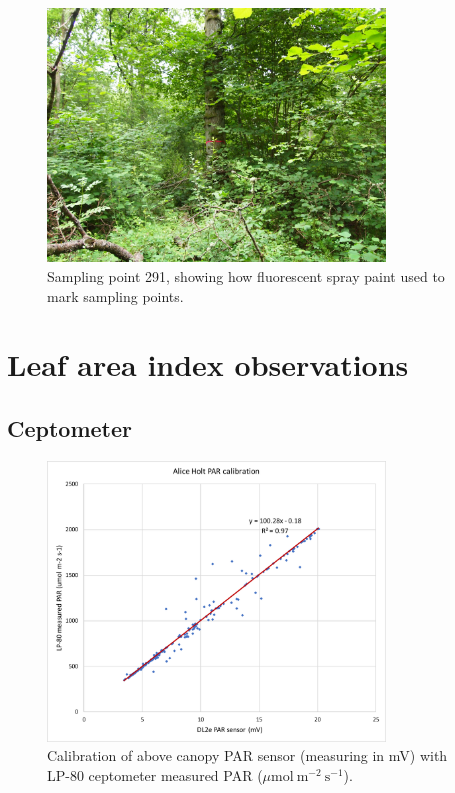 \documentclass[11pt]{article}
\begin{document}
\begin{figure}[ht]
    \centering
    \includegraphics[width=0.8\textwidth]{291E.jpg}
    \caption{Sampling point 291, showing how fluorescent spray paint used to mark sampling points.} \label{fig:pink_tree}
\end{figure}

\section{Leaf area index observations}

\subsection{Ceptometer}

\begin{figure}[ht]
    \centering
    \includegraphics[width=0.8\textwidth]{AH_PAR.pdf}
    \caption{Calibration of above canopy PAR sensor (measuring in mV) with LP-80 ceptometer measured PAR (\(\mu \text{mol}~\text{m}^{-2}~\text{s}^{-1} \)).} \label{fig:hemi_lai}
\end{figure}
\end{document}
